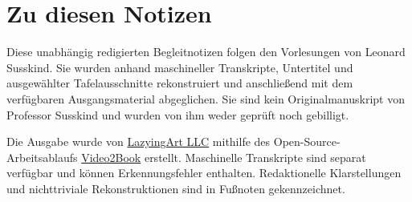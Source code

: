 \documentclass[11pt,oneside]{book}
\begin{document}
\frontmatter
\hypersetup{pageanchor=false}

\hypersetup{pageanchor=true}

\clearpage
\chapter{Zu diesen Notizen}
Diese unabhängig redigierten Begleitnotizen folgen den Vorlesungen von Leonard Susskind. Sie wurden anhand maschineller Transkripte, Untertitel und ausgewählter Tafelausschnitte rekonstruiert und anschließend mit dem verfügbaren Ausgangsmaterial abgeglichen. Sie sind kein Originalmanuskript von Professor Susskind und wurden von ihm weder geprüft noch gebilligt.

Die Ausgabe wurde von \href{https://lazying.art}{LazyingArt LLC} mithilfe des Open-Source-Arbeitsablaufs \href{https://github.com/lachlanchen/Video2Book}{Video2Book} erstellt. Maschinelle Transkripte sind separat verfügbar und können Erkennungsfehler enthalten. Redaktionelle Klarstellungen und nichttriviale Rekonstruktionen sind in Fußnoten gekennzeichnet.
\clearpage
\tableofcontents
\mainmatter










\end{document}
